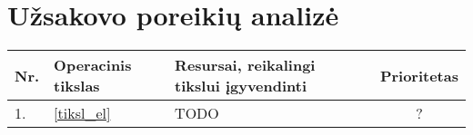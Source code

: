 \section{Užsakovo poreikių analizė}


\begin{tabular}[]{| l | p{1.6cm} | p{5.8cm} | c |}
  \hline
  Nr. & Operacinis tikslas & Resursai, reikalingi tikslui įgyvendinti &
  Prioritetas \\
  \hline
  1. & \ref{tiksl_el} & TODO & ? \\
  \hline
\end{tabular}
